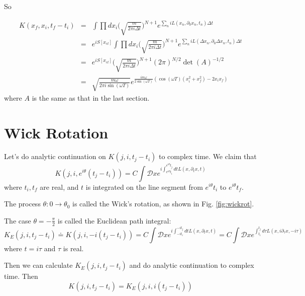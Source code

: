 \documentclass[12pt]{book}
\begin{document}
	So
	
	\begin{eqnarray}
		K(x_f,x_i,t_f-t_i) &=&\int\prod dx_i\bigg(\sqrt{\frac{m}{2\pi i\Delta t}}\bigg)^{N+1}e^{\sum_n iL( x_n,\partial_0  x_n,t_n)\Delta t}\\
		&=&e^{iS[x_{cl}]}\int\prod dx_i\bigg(\sqrt{\frac{m}{2\pi i\Delta t}}\bigg)^{N+1}e^{\sum_n iL( \Delta x_n,\partial_0  \Delta x_n,t_n)\Delta t}\\
		&=&e^{iS[x_{cl}]}\bigg(\sqrt{\frac{m}{2\pi i\Delta t}}\bigg)^{N+1}(2\pi)^{N/2}\det(A)^{-1/2}\\
		&=&\sqrt{\frac{m\omega}{2\pi i\sin(\omega T)}}e^{\frac{im\omega}{2\sin(\omega T)}(\cos(\omega T)(x_i^2+x_f^2)-2x_ix_f)}
	\end{eqnarray}
	where $A$ is the same as that in the last section.
	
	\section{Wick Rotation}
	
	Let's do analytic continuation on $K(j,i,t_j-t_i)$ to complex time. We claim that
	\begin{equation}
		K(j,i,e^{i\theta}(t_j-t_i))=C\int \mathcal Dxe^{i\int_{e^{i\theta}t_i}^{e^{i\theta}t_j}dtL(x,\partial_t x,t)}
	\end{equation}
	where $t_i,t_f$ are real, and $t$ is integrated on the line segment from $e^{i\theta}t_i$ to $e^{i\theta}t_f$.
	
	The process $\theta:0\rightarrow \theta_0$ is called the Wick's rotation, as shown in Fig. \ref{fig:wickrot}. 
	
	The case $\theta=-\frac \pi 2$ is called the Euclidean path integral:
	\begin{equation}
		K_E(j,i,t_j-t_i)\doteq K(j,i,-i(t_j-t_i))=C\int \mathcal Dxe^{i\int_{-it_i}^{-it_j}dtL(x,\partial_t x,t)}=C\int \mathcal Dxe^{\int_{t_i}^{t_j}d\tau L(x,i\partial_\tau x,-i\tau)}
	\end{equation}
	where $t=i\tau$ and $\tau$ is real.
	
	Then we can calculate $K_E(j,i,t_j-t_i)$ and do analytic continuation to complex time. Then
	\begin{equation}
		K(j,i,t_j-t_i)=K_E(j,i,i(t_j-t_i))
	\end{equation}
\end{document}
